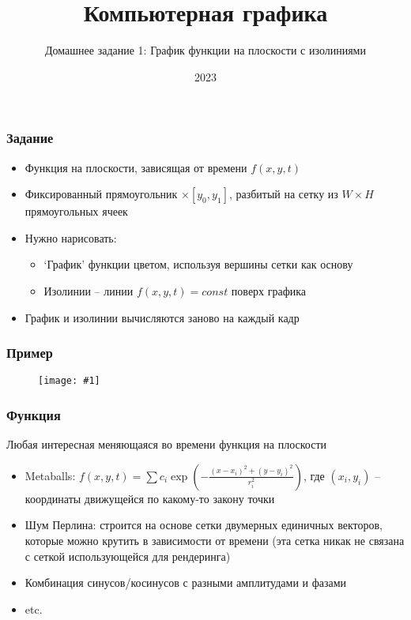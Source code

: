 \documentclass[10pt]{beamer}
\title{Компьютерная графика}
\subtitle{Домашнее задание 1: График функции на плоскости с изолиниями}
\date{2023}
\newcommand{\slideimage}[1]{
  \begin{figure}
    \begin{adjustbox}{width=\textwidth, totalheight=\textheight-2\baselineskip-2\baselineskip,keepaspectratio}
      \texttt{[image: \#1]}
    \end{adjustbox}
  \end{figure}
}
\begin{document}
\frame{\titlepage}

\begin{frame}[fragile]
\frametitle{Задание}
\begin{itemize}
\item Функция на плоскости, зависящая от времени \begin{math}f(x, y, t)\end{math}
\pause
\item Фиксированный прямоугольник \begin{math}[x_0, x_1] \times [y_0, y_1]\end{math}, разбитый на сетку из \begin{math}W\times H\end{math} прямоугольных ячеек
\pause
\item Нужно нарисовать:
\begin{itemize}
\item `График' функции цветом, используя вершины сетки как основу
\pause
\item Изолинии -- линии \begin{math}f(x,y,t) = const\end{math} поверх графика
\end{itemize}
\pause
\item График и изолинии вычисляются заново на каждый кадр
\end{itemize}
\end{frame}

\begin{frame}[fragile]
\frametitle{Пример}
\slideimage{example-plot.png}
\end{frame}

\begin{frame}[fragile]
\frametitle{Функция}
Любая интересная меняющаяся во времени функция на плоскости
\begin{itemize}
\item Metaballs: \begin{math}f(x,y,t) = \sum c_i\exp\left(-\frac{(x-x_i)^2+(y-y_i)^2}{r_i^2}\right)\end{math}, где \begin{math}(x_i, y_i)\end{math} -- координаты движущейся по какому-то закону точки
\pause
\item Шум Перлина: строится на основе сетки двумерных единичных векторов, которые можно крутить в зависимости от времени (эта сетка никак не связана с сеткой использующейся для рендеринга)
\pause
\item Комбинация синусов/косинусов с разными амплитудами и фазами
\pause
\item etc.
\end{itemize}
\end{frame}
\end{document}
